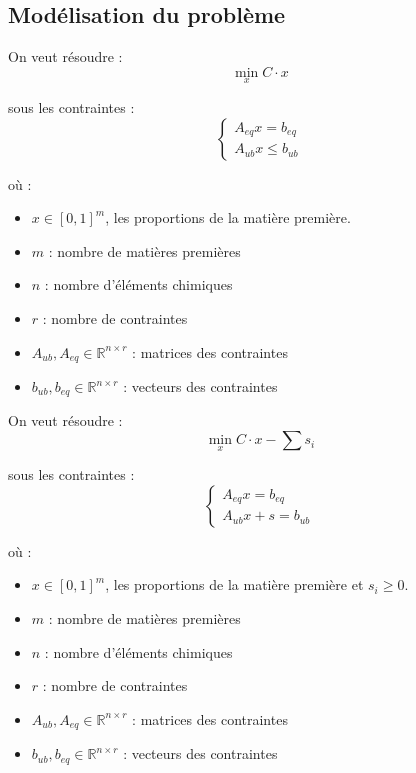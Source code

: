 \documentclass[12pt]{article}
\begin{document}
\subsection{ Modélisation du problème }


On veut résoudre :
$$ \underset{x}{\min }  C \cdot x $$

sous les contraintes :
$$
\begin{cases}
A_{eq} x = b_{eq} \\
A_{ub} x \leq b_{ub}
\end{cases}
$$

où :
\begin{itemize}
    \item \small $x \in [0,1]^m $, les proportions de la matière première.
    \item \small $m$ : nombre de matières premières
    \item \small $n$ : nombre d'éléments chimiques
    \item \small $r$ : nombre de contraintes
    \item \small $A_{ub}, A_{eq} \in \mathbb{R}^{n \times r}$ : matrices des contraintes
    \item \small $b_{ub}, b_{eq} \in \mathbb{R}^{n \times r}$ : vecteurs des contraintes
\end{itemize}




On veut résoudre :
$$ \underset{x}{\min }  C \cdot x - \sum s_i $$

sous les contraintes :
$$
\begin{cases}
A_{eq} x = b_{eq} \\
A_{ub} x + s = b_{ub}
\end{cases}
$$

où :
\begin{itemize}
    \item \small $x \in [0,1]^m $, les proportions de la matière première et $ s_i \geq 0 $.
    \item \small $m$ : nombre de matières premières
    \item \small $n$ : nombre d'éléments chimiques
    \item \small $r$ : nombre de contraintes
    \item \small $A_{ub}, A_{eq} \in \mathbb{R}^{n \times r}$ : matrices des contraintes
    \item \small $b_{ub}, b_{eq} \in \mathbb{R}^{n \times r}$ : vecteurs des contraintes
\end{itemize}
\end{document}
